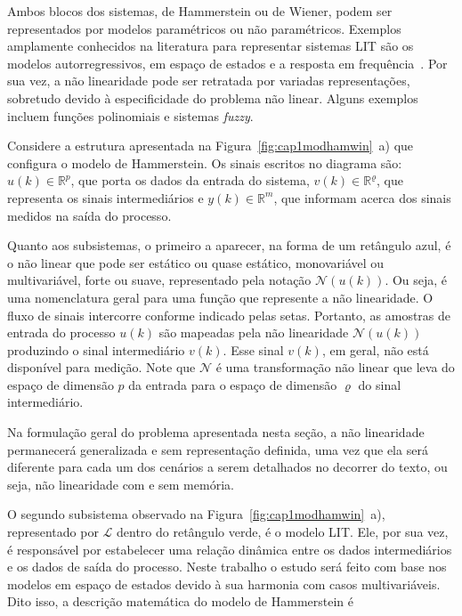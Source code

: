 %
\par 
Ambos blocos dos sistemas, de Hammerstein ou de Wiener, podem ser representados por modelos paramétricos ou não paramétricos. Exemplos amplamente conhecidos na literatura para representar sistemas \acs{LIT} são os modelos autorregressivos, em espaço de estados e a resposta em frequência~\citep{bai2010}. Por sua vez, a não linearidade pode ser retratada por variadas representações, sobretudo devido à especificidade do problema não linear. Alguns exemplos incluem funções polinomiais e sistemas \textit{fuzzy}. 
\par 
Considere a estrutura apresentada na Figura~\ref{fig:cap1modhamwin}~a) que configura o modelo de Hammerstein. Os sinais escritos no diagrama são: $u(k) \in \mathbb{R}^{ p }$, que porta os dados da entrada do sistema, $v(k) \in \mathbb{R}^{ \varrho }$, que representa os sinais intermediários e $y(k) \in \mathbb{R}^{ m }$, que informam acerca dos sinais medidos na saída do processo. 
\par 
Quanto aos subsistemas, o primeiro a aparecer, na forma de um retângulo azul, é o não linear que pode ser estático ou quase estático, monovariável ou multivariável, forte ou suave, representado pela notação $\mathcal{N}(u(k))$. Ou seja, é uma nomenclatura geral para uma função que represente a não linearidade. O fluxo de sinais intercorre conforme indicado pelas setas. Portanto, as amostras de entrada do processo $u(k)$ são mapeadas pela não linearidade $\mathcal{N}(u(k))$ produzindo o sinal intermediário $v(k)$. Esse sinal $v(k)$, em geral, não está disponível para medição. Note que $\mathcal{N}$ é uma transformação não linear que leva do espaço de dimensão $p$ da entrada para o espaço de dimensão $\varrho$ do sinal intermediário. 
\par 
Na formulação geral do problema apresentada nesta seção, a não linearidade permanecerá generalizada e sem representação definida, uma vez que ela será diferente para cada um dos cenários a serem detalhados no decorrer do texto, ou seja, não linearidade com e sem memória.
\par 
O segundo subsistema observado na Figura~\ref{fig:cap1modhamwin}~a), representado por $\mathcal{L}$ dentro do retângulo verde, é o modelo \acs{LIT}. Ele, por sua vez, é responsável por estabelecer uma relação dinâmica entre os dados intermediários e os dados de saída do processo. Neste trabalho o estudo será feito com base nos modelos em espaço de estados devido à sua harmonia com casos multivariáveis. Dito isso, a descrição matemática do modelo de Hammerstein é 
